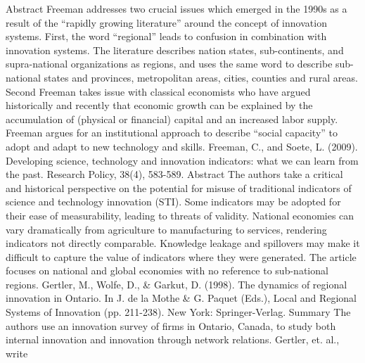 \documentclass[a4paper,11pt]{article}
\begin{document}
Abstract
Freeman addresses two crucial issues which emerged in the 1990s as a result of the “rapidly growing literature” around the concept of innovation systems. First, the word “regional” leads to confusion in combination with innovation systems. The literature describes nation states, sub-continents, and supra-national organizations as regions, and uses the same word to describe sub-national states and provinces, metropolitan areas, cities, counties and rural areas. Second Freeman takes issue with classical economists who have argued historically and recently that economic growth can be explained by the accumulation of (physical or financial) capital and an increased labor supply. Freeman argues for an institutional approach to describe “social capacity” to adopt and adapt to new technology and skills.
Freeman, C., and Soete, L. (2009). Developing science, technology and innovation indicators: what we can learn from the past. Research Policy, 38(4), 583-589.
Abstract
The authors take a critical and historical perspective on the potential for misuse of traditional indicators of science and technology innovation (STI). Some indicators may be adopted for their ease of measurability, leading to threats of validity.
National economies can vary dramatically from agriculture to manufacturing to services, rendering indicators not directly comparable. Knowledge leakage and spillovers may make it difficult to capture the value of indicators where they were generated. The article focuses on national and global economies with no reference to sub-national regions.
Gertler, M., Wolfe, D., & Garkut, D. (1998). The dynamics of regional innovation in Ontario. In J. de la Mothe & G. Paquet (Eds.), Local and Regional Systems of Innovation (pp. 211-238). New York: Springer-Verlag.
Summary
The authors use an innovation survey of firms in Ontario, Canada, to study both internal innovation and innovation through network relations. Gertler, et. al., write
 
\end{document}
